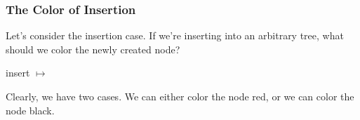 \documentclass[aspectratio=169]{beamer}
\begin{document}
\begin{frame}
  \frametitle{The Color of Insertion}

  Let's consider the insertion case. If we're inserting into an arbitrary tree, what should
  we color the newly created node?

  \pause
  \vspace{\fill}

  \begin{center}
    \begin{minipage}{0.33\textwidth}
      \begin{adjustbox}{center}
      \end{adjustbox}
    \end{minipage}
  \pause
    \begin{minipage}{0.15\textwidth}
      \begin{center}
        insert  $\mapsto$
      \end{center}
    \end{minipage}
    \begin{minipage}{0.33\textwidth}
        \begin{adjustbox}{center}
        \end{adjustbox}
    \end{minipage}
  \end{center}

  \pause
  \vspace{\fill}

  Clearly, we have two cases. We can either color the node red, or we can color
  the node black.
\end{frame}
\end{document}
